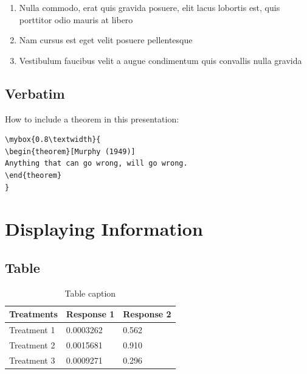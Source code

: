\documentclass[
paper=128mm:96mm, %
fontsize=11pt, %
pagesize, %
parskip=half-, %
]{scrartcl} %
\theoremstyle{mythmstyle} %
\newtheorem{theorem}{Definici\'on}[section] %
\newcommand*{\mybox}[2]{ %
\par\noindent
\begin{tikzpicture}[mynodestyle/.style={rectangle,draw=mygreen,thick,inner sep=2mm,text justified,top color=white,bottom color=white,above}]\node[mynodestyle,at={(0.5*#1+2mm+0.4pt,0)}]{ %
\begin{minipage}[t]{#1}
#2
\end{minipage}
};
\end{tikzpicture}
\par\vspace{-1.3em}}
\begin{document}
\begin{enumerate}
\item Nulla commodo, erat quis gravida posuere, elit lacus lobortis est, quis porttitor odio mauris at libero
\item Nam cursus est eget velit posuere pellentesque
\item Vestibulum faucibus velit a augue condimentum quis convallis nulla gravida
\end{enumerate}

\clearpage


\subsection{Verbatim}

How to include a theorem in this presentation:
\begin{verbatim}
\mybox{0.8\textwidth}{
\begin{theorem}[Murphy (1949)]
Anything that can go wrong, will go wrong.
\end{theorem}
}
\end{verbatim}

\clearpage



\section{Displaying Information}

\clearpage


\subsection{Table}

\begin{table}[h]
\centering
\begin{tabular}{l l l}
\toprule
\textbf{Treatments} & \textbf{Response 1} & \textbf{Response 2}\\
\midrule
Treatment 1 & 0.0003262 & 0.562 \\
Treatment 2 & 0.0015681 & 0.910 \\
Treatment 3 & 0.0009271 & 0.296 \\
\bottomrule
\end{tabular}
\caption{Table caption}
\end{table}
\end{document}
